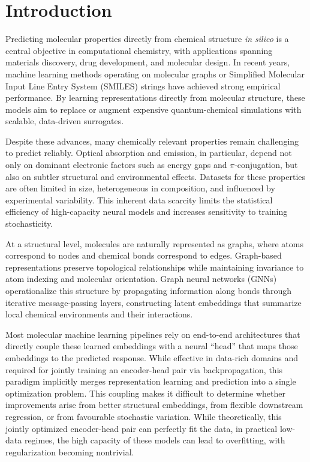 \chapter{Introduction}
Predicting molecular properties directly from chemical structure \textit{in silico} is a central objective in computational chemistry, with applications spanning materials discovery, drug development, and molecular design. In recent years, machine learning methods operating on molecular graphs or Simplified Molecular Input Line Entry System (SMILES) strings have achieved strong empirical performance. By learning representations directly from molecular structure, these models aim to replace or augment expensive quantum-chemical simulations with scalable, data-driven surrogates.

Despite these advances, many chemically relevant properties remain challenging to predict reliably. Optical absorption and emission, in particular, depend not only on dominant electronic factors such as energy gaps and $\pi$-conjugation, but also on subtler structural and environmental effects. Datasets for these properties are often limited in size, heterogeneous in composition, and influenced by experimental variability. This inherent data scarcity limits the statistical efficiency of high-capacity neural models and increases sensitivity to training stochasticity.

At a structural level, molecules are naturally represented as graphs, where atoms correspond to nodes and chemical bonds correspond to edges. Graph-based representations preserve topological relationships while maintaining invariance to atom indexing and molecular orientation. Graph neural networks (GNNs) operationalize this structure by propagating information along bonds through iterative message-passing layers, constructing latent embeddings that summarize local chemical environments and their interactions. 

Most molecular machine learning pipelines rely on end-to-end architectures that directly couple these learned embeddings with a neural ``head'' that maps those embeddings to the predicted response. While effective in data-rich domains and required for jointly training an encoder-head pair via backpropagation, this paradigm implicitly merges representation learning and prediction into a single optimization problem. This coupling makes it difficult to determine whether improvements arise from better structural embeddings, from flexible downstream regression, or from favourable stochastic variation. While theoretically, this jointly optimized encoder-head pair can perfectly fit the data, in practical low-data regimes, the high capacity of these models can lead to overfitting, with regularization becoming nontrivial. 

